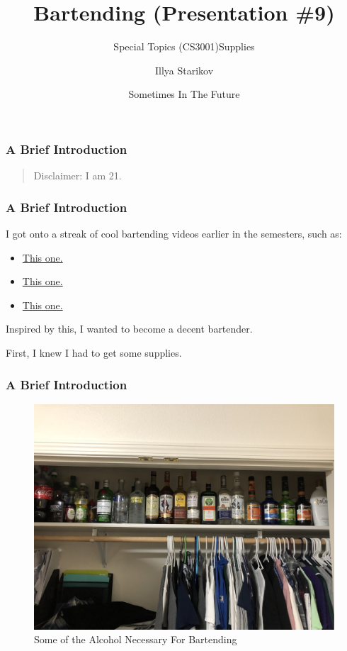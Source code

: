 \documentclass[xclolor=dvipsnames]{beamer}            %
\title{Bartending (Presentation \#9)}
\subtitle{Special Topics (CS3001)}
\author{Illya Starikov}
\date{Sometimes In The Future}
\institute{Missouri University of Science and Technology}
\begin{document}
\begin{darkframes}
    \maketitle

    \begin{frame}
        \frametitle{A Brief Introduction}

        \begin{quote}
            Disclaimer: I am 21.
        \end{quote}
    \end{frame}

    \begin{frame}
        \frametitle{A Brief Introduction}

        I got onto a streak of cool bartending videos earlier in the semesters, such as:

        \begin{itemize}
            \item \href{https://www.youtube.com/watch?v=60GJ0dJ1xmE}{This one.}
            \item \href{https://www.youtube.com/watch?v=KRNBLQYTwz4}{This one.}
            \item \href{https://www.youtube.com/watch?v=AEx6ajEeGVg}{This one.}
        \end{itemize}

        Inspired by this, I wanted to become a decent bartender.

        First, I knew I had to get some supplies.
    \end{frame}

    \begin{frame}
        \frametitle{A Brief Introduction}
        \subtitle{Supplies}

        \begin{figure}[H]
            \centering
            \includegraphics[width=.8\linewidth]{assets/alcohol.jpg}
            \caption{Some of the Alcohol Necessary For Bartending}
            \label{fig:alcohol}
        \end{figure}
    \end{frame}


\end{darkframes}
\end{document}
